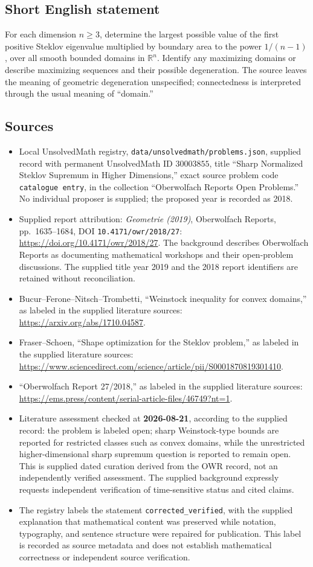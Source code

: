 \documentclass[11pt]{article}
\newcommand{\R}{\mathbb{R}}
\begin{document}
\subsection{Short English statement}
For each dimension \(n\geq3\), determine the largest possible value of the first positive Steklov eigenvalue multiplied by boundary area to the power \(1/(n-1)\), over all smooth bounded domains in \(\R^n\). Identify any maximizing domains or describe maximizing sequences and their possible degeneration. The source leaves the meaning of geometric degeneration unspecified; connectedness is interpreted through the usual meaning of ``domain.''
\subsection{Sources}
\begin{itemize}
\item Local UnsolvedMath registry, \texttt{data/unsolvedmath/problems.json}, supplied record with permanent UnsolvedMath ID \(30003855\), title ``Sharp Normalized Steklov Supremum in Higher Dimensions,'' exact source problem code \texttt{catalogue entry}, in the collection ``Oberwolfach Reports Open Problems.'' No individual proposer is supplied; the proposed year is recorded as 2018.
\item Supplied report attribution: \emph{Geometrie (2019)}, Oberwolfach Reports, pp.\ 1635--1684, DOI \texttt{10.4171/owr/2018/27}: \url{https://doi.org/10.4171/owr/2018/27}. The background describes Oberwolfach Reports as documenting mathematical workshops and their open-problem discussions. The supplied title year 2019 and the 2018 report identifiers are retained without reconciliation.
\item Bucur--Ferone--Nitsch--Trombetti, ``Weinstock inequality for convex domains,'' as labeled in the supplied literature sources: \url{https://arxiv.org/abs/1710.04587}.
\item Fraser--Schoen, ``Shape optimization for the Steklov problem,'' as labeled in the supplied literature sources: \url{https://www.sciencedirect.com/science/article/pii/S0001870819301410}.
\item ``Oberwolfach Report 27/2018,'' as labeled in the supplied literature sources: \url{https://ems.press/content/serial-article-files/46749?nt=1}.
\item Literature assessment checked at \textbf{2026-08-21}, according to the supplied record: the problem is labeled open; sharp Weinstock-type bounds are reported for restricted classes such as convex domains, while the unrestricted higher-dimensional sharp supremum question is reported to remain open. This is supplied dated curation derived from the OWR record, not an independently verified assessment. The supplied background expressly requests independent verification of time-sensitive status and cited claims.
\item The registry labels the statement \texttt{corrected\_verified}, with the supplied explanation that mathematical content was preserved while notation, typography, and sentence structure were repaired for publication. This label is recorded as source metadata and does not establish mathematical correctness or independent source verification.
\end{itemize}
\end{document}
